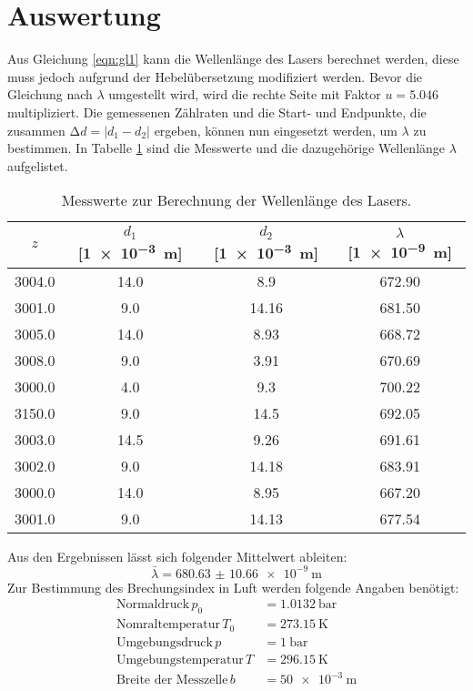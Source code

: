 \section{Auswertung}
\label{sec:Auswertung}

Aus Gleichung \eqref{eqn:gl1} kann die Wellenlänge des Lasers berechnet werden, diese muss jedoch aufgrund der Hebelübersetzung modifiziert werden.
Bevor die Gleichung nach $\lambda$ umgestellt wird, wird die rechte Seite mit Faktor $u = 5.046$ multipliziert.
Die gemessenen Zählraten und die Start- und Endpunkte, die zusammen $\increment d = |d_1-d_2|$ ergeben, können nun eingesetzt werden, um $\lambda$ zu bestimmen.
In Tabelle \ref{tab:welle} sind die Messwerte und die dazugehörige Wellenlänge $\lambda$ aufgelistet.
\begin{table}
  \centering
  \caption{Messwerte zur Berechnung der Wellenlänge des Lasers.}
  \label{tab:welle}
  \begin{tabular}{c c c c}
    \toprule
    $z$ & $d_1$ [\SI{1e-3}{\meter}] & $d_2$ [\SI{1e-3}{\meter}] & $\lambda$ [\SI{1e-9}{\meter}] \\
    \midrule
    3004.0 & 14.0 &   8.9 & 672.90 \\
    3001.0 &  9.0 & 14.16 & 681.50 \\
    3005.0 & 14.0 &  8.93 & 668.72 \\
    3008.0 &  9.0 &  3.91 & 670.69 \\
    3000.0 &  4.0 &   9.3 & 700.22 \\
    3150.0 &  9.0 &  14.5 & 692.05 \\
    3003.0 & 14.5 &  9.26 & 691.61 \\
    3002.0 &  9.0 & 14.18 & 683.91 \\
    3000.0 & 14.0 &  8.95 & 667.20 \\
    3001.0 &  9.0 & 14.13 & 677.54 \\
    \bottomrule
  \end{tabular}
\end{table}
\FloatBarrier
Aus den Ergebnissen lässt sich folgender Mittelwert ableiten:
\begin{equation*}
  \bar \lambda = \SI{680.63(1066)e-9}{\meter}
\end{equation*}
Zur Bestimmung des Brechungsindex in Luft werden folgende Angaben benötigt:
\begin{align*}
  \text{Normaldruck} \, p_0 &= \SI{1.0132}{\bar} \\
  \text{Nomraltemperatur} \, T_0 &= \SI{273.15}{\kelvin} \\
  \text{Umgebungsdruck} \, p &= \SI{1}{\bar} \\
  \text{Umgebungstemperatur} \, T &= \SI{296.15}{\kelvin} \\
  \text{Breite der Messzelle} \, b &= \SI{50e-3}{\meter} \\
\end{align*}
